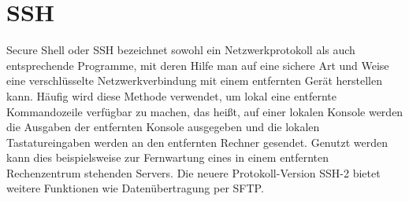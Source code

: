 \section{SSH}
Secure Shell oder SSH bezeichnet sowohl ein Netzwerkprotokoll als auch entsprechende Programme, mit deren Hilfe man auf eine sichere Art und Weise eine verschlüsselte Netzwerkverbindung mit einem entfernten Gerät herstellen kann. Häufig wird diese Methode verwendet, um lokal eine entfernte Kommandozeile verfügbar zu machen, das heißt, auf einer lokalen Konsole werden die Ausgaben der entfernten Konsole ausgegeben und die lokalen Tastatureingaben werden an den entfernten Rechner gesendet. Genutzt werden kann dies beispielsweise zur Fernwartung eines in einem entfernten Rechenzentrum stehenden Servers. Die neuere Protokoll-Version SSH-2 bietet weitere Funktionen wie Datenübertragung per SFTP.
